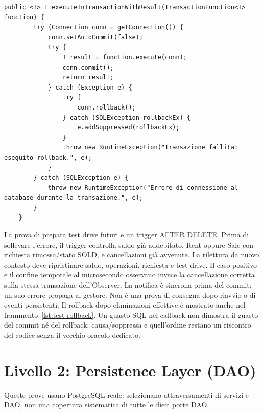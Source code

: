 \noindent\begin{minipage}{\linewidth}
\begin{lstlisting}[firstnumber=88,caption={Contratto transazionale corrente: ordine e conservazione delle eccezioni.},label=lst:test-transazione]
    public <T> T executeInTransactionWithResult(TransactionFunction<T> function) {
        try (Connection conn = getConnection()) {
            conn.setAutoCommit(false);
            try {
                T result = function.execute(conn);
                conn.commit();
                return result;
            } catch (Exception e) {
                try {
                    conn.rollback();
                } catch (SQLException rollbackEx) {
                    e.addSuppressed(rollbackEx);
                }
                throw new RuntimeException("Transazione fallita: eseguito rollback.", e);
            }
        } catch (SQLException e) {
            throw new RuntimeException("Errore di connessione al database durante la transazione.", e);
        }
    }
\end{lstlisting}
\end{minipage}


La prova  di
 prepara test drive futuri e
un trigger AFTER DELETE. Prima di sollevare
l'errore, il trigger controlla saldo già addebitato, Rent oppure Sale con
richiesta rimossa/stato SOLD, e cancellazioni già avvenute. La rilettura da
nuovo contesto deve ripristinare saldo, operazioni, richiesta e test drive.
Il caso positivo e il confine temporale al microsecondo osservano invece
la cancellazione corretta sulla stessa transazione dell'Observer.
La notifica è sincrona prima del commit; un suo errore propaga al gestore.
Non è una prova di consegna dopo riavvio o di eventi persistenti.
Il rollback dopo eliminazioni effettive è mostrato anche nel
frammento~\ref{lst:test-rollback}. Un guasto SQL nel callback non dimostra
il guasto del commit né del rollback: causa/soppressa e quell'ordine restano
un riscontro del codice senza il vecchio oracolo dedicato.

\section{Livello 2: Persistence Layer (DAO)}\label{sec:test-dao}
Queste prove usano PostgreSQL reale: selezionano attraversamenti di
servizi e DAO, non una copertura sistematica di tutte le dieci porte DAO.

